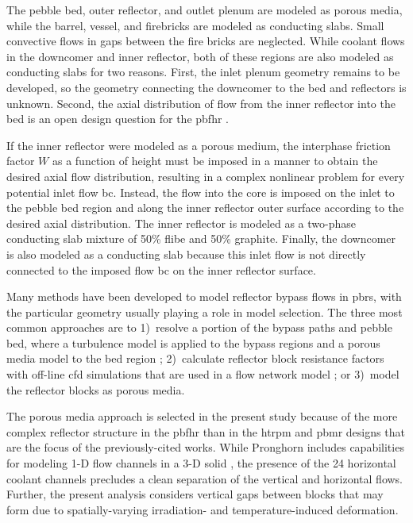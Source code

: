 The pebble bed, outer reflector, and outlet plenum are modeled as porous media, while the barrel, vessel, and firebricks are modeled as conducting slabs. Small convective flows in gaps between the fire bricks are neglected. While coolant flows in the downcomer and inner reflector, both of these regions are also modeled as conducting slabs for two reasons. First, the inlet plenum geometry remains to be developed, so the geometry connecting the downcomer to the bed and reflectors is unknown. Second, the axial distribution of flow from the inner reflector into the bed is an open design question for the \gls{pbfhr} \cite{pbfhr,xin_wang_thesis,scarlat}. 

If the inner reflector were modeled as a porous medium, the interphase friction factor \(W\) as a function of height must be imposed in a manner to obtain the desired axial flow distribution, resulting in a complex nonlinear problem for every potential inlet flow \gls{bc}. Instead, the flow into the core is imposed on the inlet to the pebble bed region and along the inner reflector outer surface according to the desired axial distribution. The inner reflector is modeled as a two-phase conducting slab mixture of 50\% \gls{flibe} and 50\% graphite. Finally, the downcomer is also modeled as a conducting slab because this inlet flow is not directly connected to the imposed flow \gls{bc} on the inner reflector surface.

Many methods have been developed to model reflector bypass flows in \glspl{pbr}, with the particular geometry usually playing a role in model selection. The three most common approaches are to 1)~resolve a portion of the bypass paths and pebble bed, where a turbulence model is applied to the bypass regions and a porous media model to the bed region \cite{ximing,rensburg}; 2)~calculate reflector block resistance factors with off-line \gls{cfd} simulations that are used in a flow network model \cite{jun2011, liu_2018,wyk}; or 3)~model the reflector blocks as porous media.

The porous media approach is selected in the present study because of the more complex reflector structure in the \gls{pbfhr} than in the \gls{htrpm} and \gls{pbmr} designs that are the focus of the previously-cited works. While Pronghorn includes capabilities for modeling 1-D flow channels in a 3-D solid \cite{nrc_2020}, the presence of the 24 horizontal coolant channels precludes a clean separation of the vertical and horizontal flows. Further, the present analysis considers vertical gaps between blocks that may form due to spatially-varying irradiation- and temperature-induced deformation. 

